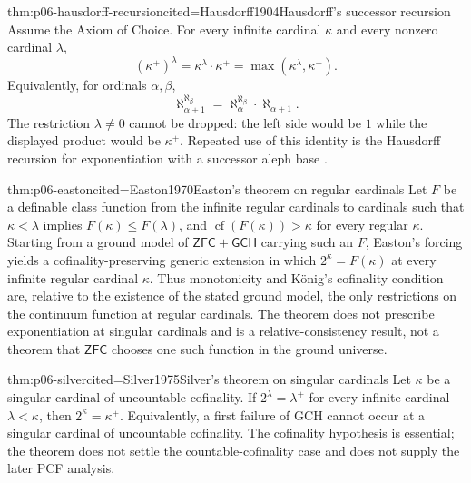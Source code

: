 
\begin{hbtheorem}{thm:p06-hausdorff-recursion}{cited=Hausdorff1904}{Hausdorff's successor recursion}
Assume the Axiom of Choice.  For every infinite cardinal \(\kappa\) and every
nonzero cardinal \(\lambda\),
\[
  (\kappa^+)^\lambda
  =\kappa^\lambda\cdot\kappa^+
  =\max(\kappa^\lambda,\kappa^+).
\]
Equivalently, for ordinals \(\alpha,\beta\),
\[
  \aleph_{\alpha+1}^{\aleph_\beta}
  =\aleph_\alpha^{\aleph_\beta}\cdot\aleph_{\alpha+1}.
\]
The restriction \(\lambda\neq0\) cannot be dropped: the left side would be
\(1\) while the displayed product would be \(\kappa^+\).  Repeated use of
this identity is the Hausdorff recursion for exponentiation with a successor
aleph base \cite{Jech2003}.
\end{hbtheorem}

\begin{hbtheorem}{thm:p06-easton}{cited=Easton1970}{Easton's theorem on regular cardinals}
Let \(F\) be a definable class function from the infinite regular cardinals to
cardinals such that
\(\kappa<\lambda\) implies \(F(\kappa)\leq F(\lambda)\), and
\(\operatorname{cf}(F(\kappa))>\kappa\) for every regular \(\kappa\).
Starting from a ground model of \(\mathsf{ZFC}+\mathsf{GCH}\) carrying such an
\(F\), Easton's forcing yields a cofinality-preserving generic extension in
which \(2^\kappa=F(\kappa)\) at every infinite regular cardinal \(\kappa\).
Thus monotonicity and K\"onig's cofinality condition are, relative to the
existence of the stated ground model, the only restrictions on the continuum
function at regular cardinals.  The theorem does not prescribe exponentiation
at singular cardinals and is a relative-consistency result, not a theorem that
\(\mathsf{ZFC}\) chooses one such function in the ground universe.
\end{hbtheorem}


\begin{hbtheorem}{thm:p06-silver}{cited=Silver1975}{Silver's theorem on singular cardinals}
Let \(\kappa\) be a singular cardinal of uncountable cofinality. If
\(2^\lambda=\lambda^+\) for every infinite cardinal \(\lambda<\kappa\), then
\(2^\kappa=\kappa^+\). Equivalently, a first failure of GCH
cannot occur at a singular cardinal of uncountable cofinality. The
cofinality hypothesis is essential; the theorem does not settle the
countable-cofinality case and does not supply the later PCF analysis.
\end{hbtheorem}

